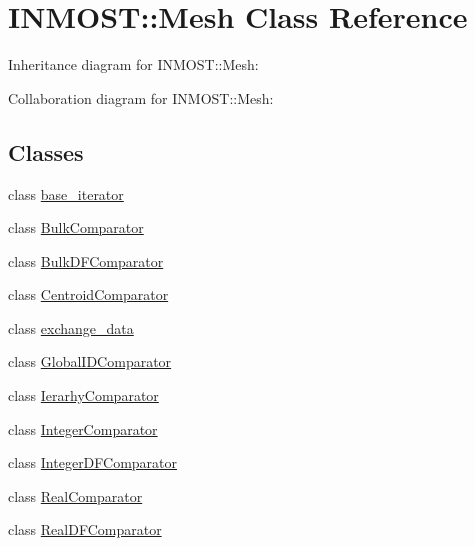 \hypertarget{classINMOST_1_1Mesh}{\section{I\-N\-M\-O\-S\-T\-:\-:Mesh Class Reference}
\label{classINMOST_1_1Mesh}
}


Inheritance diagram for I\-N\-M\-O\-S\-T\-:\-:Mesh\-:


Collaboration diagram for I\-N\-M\-O\-S\-T\-:\-:Mesh\-:
\subsection*{Classes}
\begin{DoxyCompactItemize}
\item 
class \hyperlink{classINMOST_1_1Mesh_1_1base__iterator}{base\-\_\-iterator}
\item 
class \hyperlink{classINMOST_1_1Mesh_1_1BulkComparator}{Bulk\-Comparator}
\item 
class \hyperlink{classINMOST_1_1Mesh_1_1BulkDFComparator}{Bulk\-D\-F\-Comparator}
\item 
class \hyperlink{classINMOST_1_1Mesh_1_1CentroidComparator}{Centroid\-Comparator}
\item 
class \hyperlink{classINMOST_1_1Mesh_1_1exchange__data}{exchange\-\_\-data}
\item 
class \hyperlink{classINMOST_1_1Mesh_1_1GlobalIDComparator}{Global\-I\-D\-Comparator}
\item 
class \hyperlink{classINMOST_1_1Mesh_1_1IerarhyComparator}{Ierarhy\-Comparator}
\item 
class \hyperlink{classINMOST_1_1Mesh_1_1IntegerComparator}{Integer\-Comparator}
\item 
class \hyperlink{classINMOST_1_1Mesh_1_1IntegerDFComparator}{Integer\-D\-F\-Comparator}
\item 
class \hyperlink{classINMOST_1_1Mesh_1_1RealComparator}{Real\-Comparator}
\item 
class \hyperlink{classINMOST_1_1Mesh_1_1RealDFComparator}{Real\-D\-F\-Comparator}
\end{DoxyCompactItemize}
